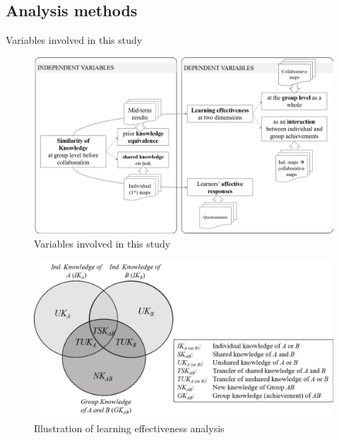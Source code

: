 \subsection{Analysis methods}
\begin{frame}{Variables involved in this study}
    \begin{figure}[tb]
     \begin{center}
      \includegraphics[width=120mm]{images/rqb_variables.pdf}
      \end{center}
      \caption{Variables involved in this study}
      \label{variables}  
\end{figure}
\end{frame}

\begin{frame}
    \begin{figure}[tb]
     \begin{center}
      \includegraphics[width=120mm]{images/rqb_learn-effective.pdf}
      \end{center}
      \caption{Illustration of learning effectiveness analysis}
      \label{learn-effective}  
    \end{figure}
\end{frame}

